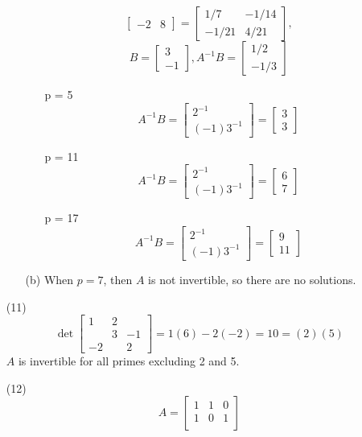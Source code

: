 \begin{itemize}
\begin{itemize}
$$\begin{bmatrix}
-2 & 8
\end{bmatrix} = \begin{bmatrix}
1/7 & -1/14 \\
-1/21 & 4/21
\end{bmatrix},$$
$$B = \begin{bmatrix}
3 \\
-1
\end{bmatrix}, A^{-1}B = \begin{bmatrix}
1/2 \\
-1/3
\end{bmatrix}$$
\begin{itemize}
\item[p = 5]
$$A^{-1}B = \begin{bmatrix}
2^{-1} \\
(-1)3^{-1}
\end{bmatrix} = \begin{bmatrix}
3 \\
3
\end{bmatrix}$$
\item[p = 11]
$$A^{-1}B = \begin{bmatrix}
2^{-1} \\
(-1)3^{-1}
\end{bmatrix} = \begin{bmatrix}
6 \\
7
\end{bmatrix}$$
\item[p = 17]
$$A^{-1}B = \begin{bmatrix}
2^{-1} \\
(-1)3^{-1}
\end{bmatrix} = \begin{bmatrix}
9 \\
11
\end{bmatrix}$$
\end{itemize}
\item[(b)]
When $p = 7$, then $A$ is not invertible, so there are no solutions.
\end{itemize}
\item[(11)]
$$\det \begin{bmatrix}
1 & 2 \\
& 3 & -1 \\
-2 & & 2
\end{bmatrix} = 1(6) - 2(-2) = 10 = (2)(5)$$
$A$ is invertible for all primes excluding 2 and 5.
\item[(12)]
$$A = \begin{bmatrix}
1 & 1 & 0 \\
1 & 0 & 1 \\

\end{bmatrix}$$
\end{itemize}

